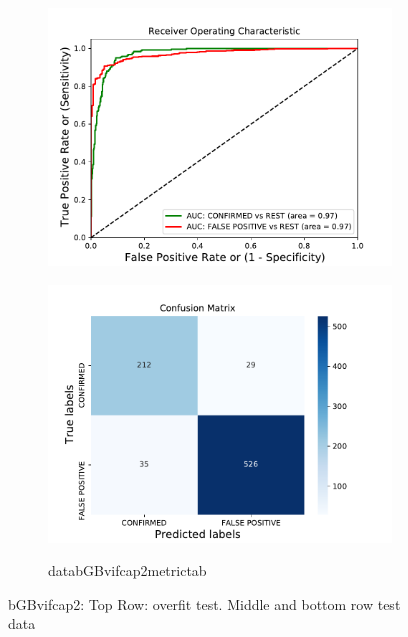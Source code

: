 \begin{figure}[H]
\begin{subfigure}{.49\textwidth}
                \includegraphics[width = 1\textwidth]{data/bGB_vif_cap2_roc.pdf}
                \end{subfigure}
                \begin{subfigure}{.49\textwidth}
                \includegraphics[width = 1\textwidth]{data/bGB_vif_cap2_cm.pdf}
                \end{subfigure}
                \begin{subfigure}{1\textwidth}
                \csname databGBvifcap2metrictab\endcsname
                \end{subfigure}
                \caption{bGBvifcap2: Top Row: overfit test. Middle and bottom row test data}
                \label{fig:data/bGB_vif_cap2_roc}
                \end{figure}